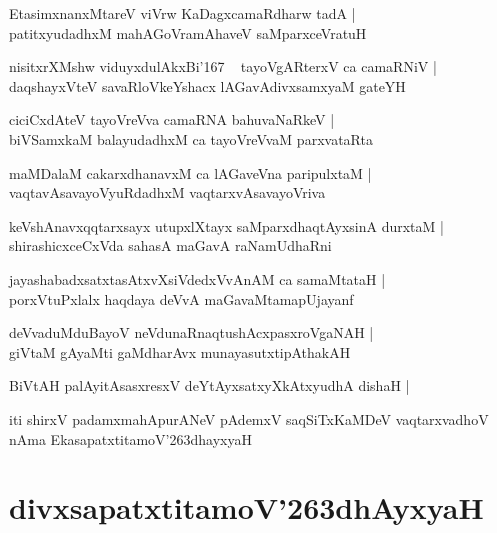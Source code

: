 \documentclass[twoside,12pt,openright]{book}
\def\S{\char'263}
\newcounter{shloka}[chapter]
\begin{document}
\begin{shloka}%
EtasimxnanxMtareV viVrw KaDagxcamaRdharw tadA |\\
patitxyudadhxM mahAGoVramAhaveV saMparxceVratuH 
\end{shloka}

\begin{shloka}%
nisitxrXMshw viduyxdulAkxBi\char'167 ~ tayoVgARterxV ca camaRNiV |\\
daqshayxVteV savaRloVkeYshacx lAGavAdivxsamxyaM gateYH 
\end{shloka}

\begin{shloka}%
ciciCxdAteV tayoVreVva camaRNA bahuvaNaRkeV |\\
biVSamxkaM balayudadhxM ca tayoVreVvaM parxvataRta
\end{shloka}

\begin{shloka}%
maMDalaM cakarxdhanavxM ca lAGaveVna paripulxtaM |\\
vaqtavAsavayoVyuRdadhxM vaqtarxvAsavayoVriva 
\end{shloka}

\begin{shloka}%
keVshAnavxqqtarxsayx utupxlXtayx saMparxdhaqtAyxsinA durxtaM |\\
shirashicxceCxVda sahasA maGavA raNamUdhaRni
\end{shloka}

\begin{shloka}%
jayashabadxsatxtasAtxvXsiVdedxVvAnAM ca samaMtataH |\\
porxVtuPxlalx haqdaya deVvA maGavaMtamapUjayanf 
\end{shloka}

\begin{shloka}%
deVvaduMduBayoV neVdunaRnaqtushAcxpasxroVgaNAH |\\
giVtaM gAyaMti gaMdharAvx munayasutxtipAthakAH 
\end{shloka}

\begin{shloka}%
BiVtAH palAyitAsasxresxV deYtAyxsatxyXkAtxyudhA dishaH |\\
\end{shloka}

\begin{center}
iti shirxV padamxmahApurANeV pAdemxV saqSiTxKaMDeV vaqtarxvadhoV nAma EkasapatxtitamoV\S dhayxyaH 
\end{center}

\chapter{divxsapatxtitamoV\S dhAyxyaH}
\end{document}
